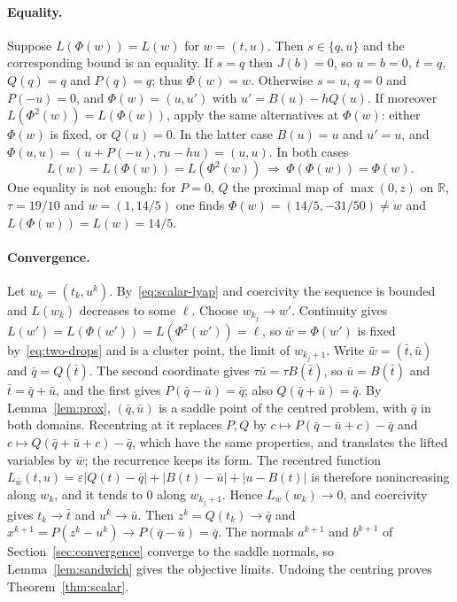 \documentclass[11pt]{article}
\numberwithin{equation}{section}
\theoremstyle{definition}
\theoremstyle{remark}
\newcommand{\R}{\mathbb R}
\begin{document}
\paragraph{Equality.} Suppose $L(\Phi(w))=L(w)$ for $w=(t,u)$. Then $s\in\{q,u\}$ and the corresponding bound is an equality. If $s=q$ then $J(b)=0$, so $u=b=0$, $t=q$, $Q(q)=q$ and $P(q)=q$; thus $\Phi(w)=w$. Otherwise $s=u$, $q=0$ and $P(-u)=0$, and $\Phi(w)=(u,u')$ with $u'=B(u)-hQ(u)$. If moreover $L(\Phi^2(w))=L(\Phi(w))$, apply the same alternatives at $\Phi(w)$: either $\Phi(w)$ is fixed, or $Q(u)=0$. In the latter case $B(u)=u$ and $u'=u$, and $\Phi(u,u)=(u+P(-u),\tau u-hu)=(u,u)$. In both cases
\begin{equation}\label{eq:two-drops}
L(w)=L(\Phi(w))=L(\Phi^2(w))\ \Longrightarrow\ \Phi(\Phi(w))=\Phi(w).
\end{equation}
One equality is not enough: for $P=0$, $Q$ the proximal map of $\max(0,z)$ on $\R$, $\tau=19/10$ and $w=(1,14/5)$ one finds $\Phi(w)=(14/5,-31/50)\ne w$ and $L(\Phi(w))=L(w)=14/5$.

\paragraph{Convergence.} Let $w_k=(t_k,u^k)$. By~\eqref{eq:scalar-lyap} and coercivity the sequence is bounded and $L(w_k)$ decreases to some $\ell$. Choose $w_{k_j}\to w'$. Continuity gives $L(w')=L(\Phi(w'))=L(\Phi^2(w'))=\ell$, so $\bar w=\Phi(w')$ is fixed by~\eqref{eq:two-drops} and is a cluster point, the limit of $w_{k_j+1}$. Write $\bar w=(\bar t,\bar u)$ and $\bar q=Q(\bar t)$. The second coordinate gives $\tau\bar u=\tau B(\bar t)$, so $\bar u=B(\bar t)$ and $\bar t=\bar q+\bar u$, and the first gives $P(\bar q-\bar u)=\bar q$; also $Q(\bar q+\bar u)=\bar q$. By Lemma~\ref{lem:prox}, $(\bar q,\bar u)$ is a saddle point of the centred problem, with $\bar q$ in both domains. Recentring at it replaces $P,Q$ by $c\mapsto P(\bar q-\bar u+c)-\bar q$ and $c\mapsto Q(\bar q+\bar u+c)-\bar q$, which have the same properties, and translates the lifted variables by $\bar w$; the recurrence keeps its form. The recentred function $L_{\bar w}(t,u)=\varepsilon\lvert Q(t)-\bar q\rvert+\lvert B(t)-\bar u\rvert+\lvert u-B(t)\rvert$ is therefore nonincreasing along $w_k$, and it tends to $0$ along $w_{k_j+1}$. Hence $L_{\bar w}(w_k)\to0$, and coercivity gives $t_k\to\bar t$ and $u^k\to\bar u$. Then $z^k=Q(t_k)\to\bar q$ and $x^{k+1}=P(z^k-u^k)\to P(\bar q-\bar u)=\bar q$. The normals $a^{k+1}$ and $b^{k+1}$ of Section~\ref{sec:convergence} converge to the saddle normals, so Lemma~\ref{lem:sandwich} gives the objective limits. Undoing the centring proves Theorem~\ref{thm:scalar}.
\end{document}
